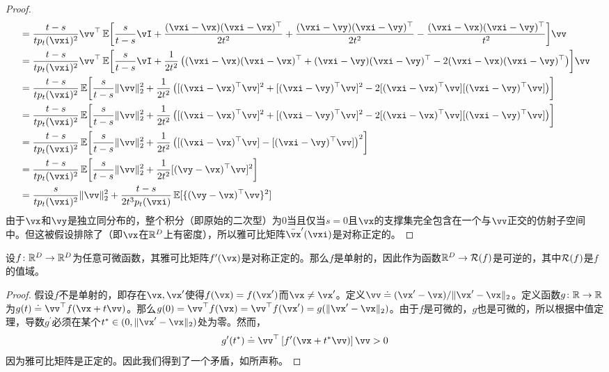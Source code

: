 \documentclass[../../book-main.tex]{subfiles}
\begin{document}
\begin{proof}
\begin{align}
        &= \frac{t - s}{tp_{t}(\vxi)^{2}}\vv^{\top}\Ex\rs{\frac{s}{t - s}\vI +\frac{(\vxi - \vx)(\vxi - \vx)^{\top}}{2t^{2}} + \frac{(\vxi - \vy)(\vxi - \vy)^{\top}}{2t^{2}} - \frac{(\vxi - \vx)(\vxi - \vy)^{\top}}{t^{2}}}\vv \\
        &= \frac{t - s}{tp_{t}(\vxi)^{2}}\vv^{\top}\Ex\rs{\frac{s}{t - s}\vI +\frac{1}{2t^{2}}\bp{(\vxi - \vx)(\vxi - \vx)^{\top} + (\vxi - \vy)(\vxi - \vy)^{\top} - 2(\vxi - \vx)(\vxi - \vy)^{\top}}}\vv \\
        &= \frac{t - s}{tp_{t}(\vxi)^{2}}\Ex\rs{\frac{s}{t - s}\norm{\vv}_{2}^{2} +\frac{1}{2t^{2}}\bp{[(\vxi - \vx)^{\top}\vv]^{2} + [(\vxi - \vy)^{\top}\vv]^{2} - 2[(\vxi - \vx)^{\top}\vv][(\vxi - \vy)^{\top}\vv]}} \\
        &= \frac{t - s}{tp_{t}(\vxi)^{2}}\Ex\rs{\frac{s}{t - s}\norm{\vv}_{2}^{2} +\frac{1}{2t^{2}}\bp{[(\vxi - \vx)^{\top}\vv]^{2} + [(\vxi - \vy)^{\top}\vv]^{2} - 2[(\vxi - \vx)^{\top}\vv][(\vxi - \vy)^{\top}\vv]}} \\
        &= \frac{t - s}{tp_{t}(\vxi)^{2}}\Ex\rs{\frac{s}{t - s}\norm{\vv}_{2}^{2} +\frac{1}{2t^{2}}\bp{[(\vxi - \vx)^{\top}\vv] - [(\vxi - \vy)^{\top}\vv]}^{2}} \\
        &= \frac{t - s}{tp_{t}(\vxi)^{2}}\Ex\rs{\frac{s}{t - s}\norm{\vv}_{2}^{2} +\frac{1}{2t^{2}}[(\vy - \vx)^{\top}\vv]^{2}} \\
        &= \frac{s}{tp_{t}(\vxi)^{2}}\norm{\vv}_{2}^{2} + \frac{t - s}{2t^{3}p_{t}(\vxi)}\Ex[\{(\vy - \vx)^{\top}\vv\}^{2}]
    \end{align}
    由于\(\vx\)和\(\vy\)是独立同分布的，整个积分（即原始的二次型）为\(0\)当且仅当\(s = 0\)且\(\vx\)的支撑集完全包含在一个与\(\vv\)正交的仿射子空间中。但这被假设排除了（即\(\vx\)在\(\mathbb{R}^{D}\)上有密度），所以雅可比矩阵\(\bar{\vx}^{\prime}(\vxi)\)是对称正定的。
\end{proof}

\begin{lemma}\label{lem:gribonval_A2}
    设\(f \colon \mathbb{R}^{D} \to \mathbb{R}^{D}\)为任意可微函数，其雅可比矩阵\(f^{\prime}(\vx)\)是对称正定的。那么\(f\)是单射的，因此作为函数\(\mathbb{R}^{D} \to \mathcal{R}(f)\)是可逆的，其中\(\mathcal{R}(f)\)是\(f\)的值域。
\end{lemma}
\begin{proof}
    假设\(f\)不是单射的，即存在\(\vx, \vx^{\prime}\)使得\(f(\vx) = f(\vx^{\prime})\)而\(\vx \neq \vx^{\prime}\)。定义\(\vv \doteq (\vx^{\prime} - \vx)/\norm{\vx^{\prime} - \vx}_{2}\)。定义函数\(g \colon \mathbb{R} \to \mathbb{R}\)为\(g(t) \doteq \vv^{\top}f(\vx + t\vv)\)。那么\(g(0) = \vv^{\top}f(\vx) = \vv^{\top}f(\vx^{\prime}) = g(\norm{\vx^{\prime} - \vx}_{2})\)。由于\(f\)是可微的，\(g\)也是可微的，所以根据中值定理，导数\(g^{\prime}\)必须在某个\(t^{\ast} \in (0, \norm{\vx^{\prime} - \vx}_{2})\)处为零。然而，
    \begin{equation}
        g^{\prime}(t^{\ast}) \doteq \vv^{\top}\bs{f^{\prime}(\vx + t^{\ast}\vv)}\vv > 0
    \end{equation}
    因为雅可比矩阵是正定的。因此我们得到了一个矛盾，如所声称。
\end{proof}
\end{document}
